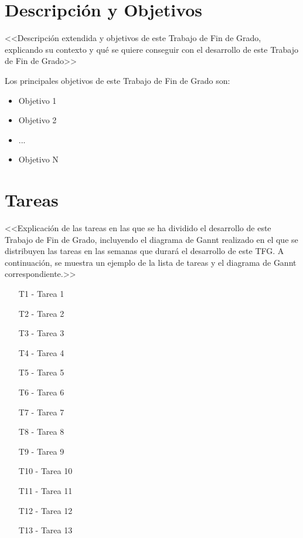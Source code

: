 



\renewcommand{\TituloTFG}{ Plan de Trabajo\\TITULO TFG}




\chapter*{Descripción y Objetivos}

<<Descripción extendida y objetivos de este Trabajo de Fin de Grado, explicando su contexto y qué se quiere conseguir con el desarrollo de este Trabajo de Fin de Grado>>

Los principales objetivos de este Trabajo de Fin de Grado son:
\begin{itemize}
    \item Objetivo 1
    \item Objetivo 2
    \item ...
    \item Objetivo N
\end{itemize}

\chapter*{Tareas}

<<Explicación de las tareas en las que se ha dividido el desarrollo de este Trabajo de Fin de Grado, incluyendo el diagrama de Gannt realizado en el que se distribuyen las tareas en las semanas que durará el desarrollo de este TFG. A continuación, se muestra un ejemplo de la lista de tareas y el diagrama de Gannt correspondiente.>>

\begin{enumerate}
    \item[T1 -] Tarea 1
    \item[T2 -] Tarea 2
    \item[T3 -] Tarea 3
    \item[T4 -] Tarea 4
    \item[T5 -] Tarea 5
    \item[T6 -] Tarea 6
    \item[T7 -] Tarea 7
    \item[T8 -] Tarea 8
    \item[T9 -] Tarea 9
    \item[T10 -] Tarea 10
    \item[T11 -] Tarea 11
    \item[T12 -] Tarea 12
    \item[T13 -] Tarea 13
\end{enumerate}


